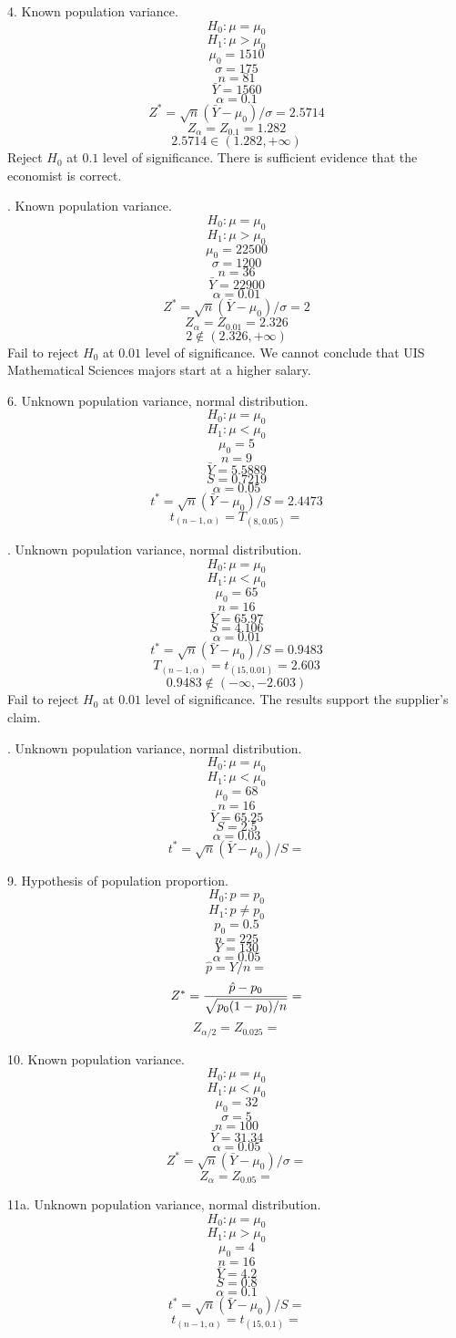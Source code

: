 \vfill
\eject

4. Known population variance.
$$H_0: \mu=\mu_0$$
$$H_1: \mu>\mu_0$$
$$\mu_0=1510$$
$$\sigma=175$$
$$n=81$$
$$\bar Y=1560$$
$$\alpha=0.1$$
$$Z^*=\sqrt n(\bar Y-\mu_0)/\sigma=2.5714$$
$$Z_\alpha=Z_{0.1}=1.282$$
$$2.5714\in(1.282,+\infty)$$
Reject $H_0$ at $0.1$ level of significance.
There is sufficient evidence that the economist is correct.

. Known population variance.
$$H_0: \mu=\mu_0$$
$$H_1: \mu>\mu_0$$
$$\mu_0=22500$$
$$\sigma=1200$$
$$n=36$$
$$\bar Y=22900$$
$$\alpha=0.01$$
$$Z^*=\sqrt n(\bar Y-\mu_0)/\sigma=2$$
$$Z_\alpha=Z_{0.01}=2.326$$
$$2\not\in(2.326,+\infty)$$
Fail to reject $H_0$ at $0.01$ level of significance.
We cannot conclude that UIS Mathematical Sciences
majors start at a higher salary.

\vfill
\eject

6. Unknown population variance, normal distribution.
$$H_0:\mu=\mu_0$$
$$H_1:\mu<\mu_0$$
$$\mu_0=5$$
$$n=9$$
$$\bar Y=5.5889$$
$$S=0.7219$$
$$\alpha=0.05$$
$$t^*=\sqrt n(\bar Y-\mu_0)/S=2.4473$$
$$t_{(n-1,\alpha)}=T_{(8,0.05)}=$$

. Unknown population variance, normal distribution.
$$H_0:\mu=\mu_0$$
$$H_1:\mu<\mu_0$$
$$\mu_0=65$$
$$n=16$$
$$\bar Y=65.97$$
$$S=4.106$$
$$\alpha=0.01$$
$$t^*=\sqrt n(\bar Y-\mu_0)/S=0.9483$$
$$T_{(n-1,\alpha)}=t_{(15,0.01)}=2.603$$
$$0.9483\not\in(-\infty,-2.603)$$
Fail to reject $H_0$ at $0.01$ level of significance.
The results support the supplier's claim.

\vfill
{}. Unknown population variance, normal distribution.
$$H_0:\mu=\mu_0$$
$$H_1:\mu<\mu_0$$
$$\mu_0=68$$
$$n=16$$
$$\bar Y=65.25$$
$$S=2.5$$
$$\alpha=0.03$$
$$t^*=\sqrt n(\bar Y-\mu_0)/S=$$

\vfill
\eject

9. Hypothesis of population proportion.
$$H_0:p=p_0$$
$$H_1:p\ne p_0$$
$$p_0=0.5$$
$$n=225$$
$$Y=130$$
$$\alpha=0.05$$
$$\hat p=Y/n=$$
$$Z^*={\hat p - p_0\over\sqrt{p_0(1-p_0)/n}}=$$
$$Z_{\alpha/2}=Z_{0.025}=$$

\vfill
\eject

10. Known population variance.
$$H_0:\mu=\mu_0$$
$$H_1:\mu<\mu_0$$
$$\mu_0=32$$
$$\sigma=5$$
$$n=100$$
$$\bar Y=31.34$$
$$\alpha=0.05$$
$$Z^*=\sqrt n(\bar Y-\mu_0)/\sigma=$$
$$Z_\alpha=Z_{0.05}=$$

\vfill
\eject

11a. Unknown population variance, normal distribution.
$$H_0:\mu=\mu_0$$
$$H_1:\mu>\mu_0$$
$$\mu_0=4$$
$$n=16$$
$$\bar Y=4.2$$
$$S=0.8$$
$$\alpha=0.1$$
$$t^*=\sqrt n(\bar Y-\mu_0)/S=$$
$$t_{(n-1,\alpha)}=t_{(15,0.1)}=$$

